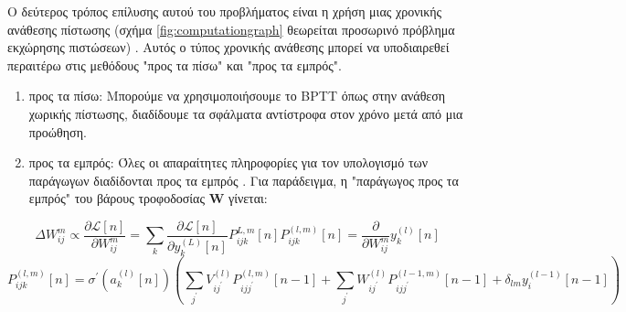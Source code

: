 \documentclass[12pt]{report}
\begin{document}
Ο δεύτερος τρόπος επίλυσης αυτού του προβλήματος είναι η χρήση μιας χρονικής ανάθεσης πίστωσης (σχήμα \ref{fig:computationgraph} θεωρείται προσωρινό πρόβλημα εκχώρησης πιστώσεων) . Αυτός ο τύπος χρονικής ανάθεσης μπορεί να υποδιαιρεθεί περαιτέρω στις μεθόδους "προς τα πίσω" και "προς τα εμπρός".
\begin{enumerate}
  
    \item προς τα πίσω: Μπορούμε να χρησιμοποιήσουμε το \textlatin{BPTT} όπως στην ανάθεση χωρικής πίστωσης, διαδίδουμε τα σφάλματα αντίστροφα στον χρόνο μετά από μια προώθηση.
    \item προς τα εμπρός: Όλες οι απαραίτητες πληροφορίες για τον υπολογισμό των παράγωγων διαδίδονται προς τα εμπρός \cite{williams1989}. Για παράδειγμα, η "παράγωγος προς τα εμπρός" του βάρους τροφοδοσίας $\mathbf{W}$ γίνεται:
\end{enumerate}
\begin{equation*}
\Delta W_{i j}^{m} \propto \frac{\partial \mathcal{L}[n]}{\partial W_{i j}^{m}}=\sum_{k} \frac{\partial \mathcal{L}[n]}{\partial y_{k}^{(L)}[n]} P_{i j k}^{L, m}[n]
P_{i j k}^{(l, m)}[n]=\frac{\partial}{\partial W_{i j}^{m}} y_{k}^{(l)}[n]
\end{equation*}
\begin{equation*}
P_{i j k}^{(l, m)}[n]=\sigma^{\prime}\left(a_{k}^{(l)}[n]\right)\left(\sum_{j^{\prime}} V_{i j^{\prime}}^{(l)} P_{i j j^{\prime}}^{(l, m)}[n-1]+\sum_{j^{\prime}} W_{i j^{\prime}}^{(l)} P_{i j j^{\prime}}^{(l-1, m)}[n-1]+\delta_{l m} y_{i}^{(l-1)}[n-1]\right)
\end{equation*}
\end{document}
